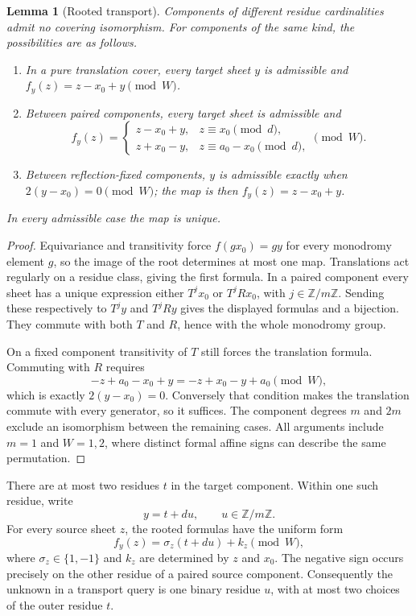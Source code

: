 \documentclass[11pt]{article}
\newtheorem{lemma}[theorem]{Lemma}
\theoremstyle{definition}
\theoremstyle{remark}
\newcommand{\Z}{\mathbb Z}
\begin{document}
\begin{lemma}[Rooted transport]\label{lem:bt-rooted}
Components of different residue cardinalities admit no covering
isomorphism.  For components of the same kind, the possibilities are as
follows.
\begin{enumerate}
\item In a pure translation cover, every target sheet $y$ is admissible and
$f_y(z)=z-x_0+y\pmod W$.
\item Between paired components, every target sheet is admissible and
\[
 f_y(z)=
 \begin{cases}
 z-x_0+y,&z\equiv x_0\pmod d,\\
 z+x_0-y,&z\equiv a_0-x_0\pmod d,
 \end{cases}\pmod W.
\]
\item Between reflection-fixed components, $y$ is admissible exactly when
$2(y-x_0)=0\pmod W$; the map is then $f_y(z)=z-x_0+y$.
\end{enumerate}
In every admissible case the map is unique.
\end{lemma}
\begin{proof}
Equivariance and transitivity force $f(gx_0)=gy$ for every monodromy
element $g$, so the image of the root determines at most one map.
Translations act regularly on a residue class, giving the first formula.
In a paired component every sheet has a unique expression either
$T^j x_0$ or $T^jRx_0$, with $j\in\Z/m\Z$.  Sending these respectively to
$T^jy$ and $T^jRy$ gives the displayed formulas and a bijection.  They
commute with both $T$ and $R$, hence with the whole monodromy group.

On a fixed component transitivity of $T$ still forces the translation
formula.  Commuting with $R$ requires
\[
 -z+a_0-x_0+y=-z+x_0-y+a_0\pmod W,
\]
which is exactly $2(y-x_0)=0$.  Conversely that condition makes the
translation commute with every generator, so it suffices.  The component
degrees $m$ and $2m$ exclude an isomorphism between the remaining cases.
All arguments include $m=1$ and $W=1,2$, where distinct formal affine
signs can describe the same permutation.
\end{proof}

There are at most two residues $t$ in the target component.  Within one
such residue, write
\begin{equation}\label{eq:bt-root-parameter}
 y=t+du,\qquad u\in\Z/m\Z.
\end{equation}
For every source sheet $z$, the rooted formulas have the uniform form
\begin{equation}\label{eq:bt-uniform-map}
 f_y(z)=\sigma_z(t+du)+k_z\pmod W,
\end{equation}
where $\sigma_z\in\{1,-1\}$ and $k_z$ are determined by $z$ and $x_0$.
The negative sign occurs precisely on the other residue of a paired
source component.  Consequently the unknown in a transport query is one
binary residue $u$, with at most two choices of the outer residue $t$.
\end{document}
